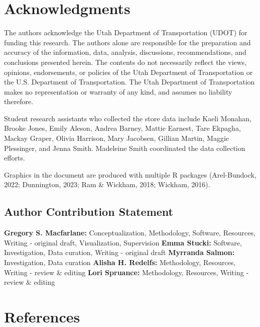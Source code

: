 \documentclass[
  letterpaper,
  number,
  review,
  3p]{elsarticle}
\begin{document}

\section*{Acknowledgments}\label{acknowledgments}


The authors acknowledge the Utah Department of Transportation (UDOT) for
funding this research. The authors alone are responsible for the
preparation and accuracy of the information, data, analysis,
discussions, recommendations, and conclusions presented herein. The
contents do not necessarily reflect the views, opinions, endorsements,
or policies of the Utah Department of Transportation or the U.S.
Department of Transportation. The Utah Department of Transportation
makes no representation or warranty of any kind, and assumes no
liability therefore.

Student research assistants who collected the store data include Kaeli
Monahan, Brooke Jones, Emily Aleson, Andrea Barney, Mattie Earnest, Tare
Ekpagha, Mackay Graper, Olivia Harrison, Mary Jacobsen, Gillian Martin,
Maggie Plessinger, and Jenna Smith. Madeleine Smith coordinated the data
collection efforts.

Graphics in the document are produced with multiple R packages
(Arel-Bundock, 2022; Dunnington, 2023; Ram \& Wickham, 2018; Wickham,
2016).

\subsection*{Author Contribution
Statement}\label{author-contribution-statement}


\textbf{Gregory S. Macfarlane:} Conceptualization, Methodology,
Software, Resources, Writing - original draft, Visualization,
Supervision \textbf{Emma Stucki:} Software, Investigation, Data
curation, Writing - original draft \textbf{Myrranda Salmon:}
Investigation, Data curation \textbf{Alisha H. Redelfs:} Methodology,
Resources, Writing - review \& editing \textbf{Lori Spruance:}
Methodology, Resources, Writing - review \& editing


\section*{References}\label{references}
\end{document}

